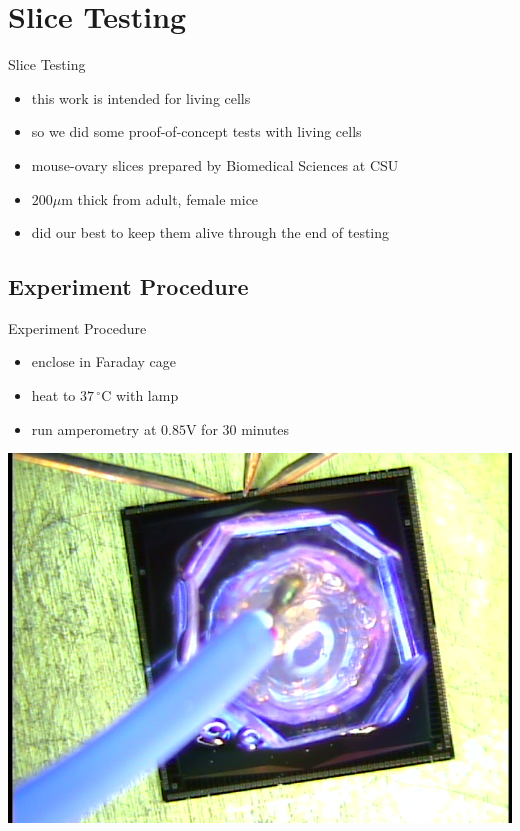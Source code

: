 \documentclass[10pt]{beamer}
\begin{document}
\section{Slice Testing}
\begin{frame}{Slice Testing}
	\begin{itemize}
		\item this work is intended for living cells
		\item so we did some proof-of-concept tests with living cells
		\item mouse-ovary slices prepared by Biomedical Sciences at CSU
		\item $200 \mu \mathrm{m}$ thick from adult, female mice
		\item did our best to keep them alive through the end of testing
	\end{itemize}
\end{frame}

\subsection{Experiment Procedure}
\begin{frame}{Experiment Procedure}
	\begin{itemize}
		\item enclose in Faraday cage
		\item heat to $37\,^{\circ}\mathrm{C}$ with lamp
		\item run amperometry at $0.85 \mathrm{V}$ for 30 minutes
	\end{itemize}
	\includegraphics[width=0.8\linewidth]{figures/slice-top.png}
\end{frame}
\end{document}

